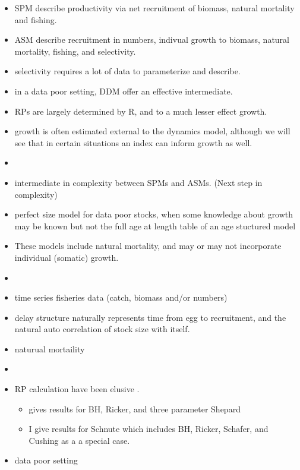  

%
\begin{itemize}
	\item SPM describe productivity via net recruitment of biomass, natural mortality and fishing.
	\item ASM describe recruitment in numbers, indivual growth to biomass, natural mortality, fishing, and selectivity.
	\item selectivity requires a lot of data to parameterize and describe. 
	\item in a data poor setting, DDM offer an effective intermediate.
	\item RPs are largely determined by R, and to a much lesser effect growth. 
	\item growth is often estimated external to the dynamics model, although we will see that in certain situations an index can inform growth as well.
	\item 
\end{itemize}

%
\begin{itemize}
	\item intermediate in complexity between SPMs and ASMs. (Next step in complexity)
	\item perfect size model for data poor stocks, when some knowledge about growth may be known but not the full age at length table of an age stuctured model \cite{black rockfish assessment}
	\item These models include natural mortality, and may or may not \cite{dbSRA} incorporate individual (somatic) growth. 
	\item 
	\item time series fisheries data (catch, biomass and/or numbers)
	\item delay structure naturally represents time from egg to recruitment, and the natural auto correlation of stock size with itself.
	\item naturual mortaility
	\item 
	\item RP calculation have been elusive \cite{Munyandorero2023, Schnute}.
	\begin{itemize}
	\item \cite{Munyandorero2023} gives results for BH, Ricker, and three parameter Shepard
	\item I give results for Schnute which includes BH, Ricker, Schafer, and Cushing as a a special case.
	\end{itemize}
	
	\item data poor setting
\end{itemize}


